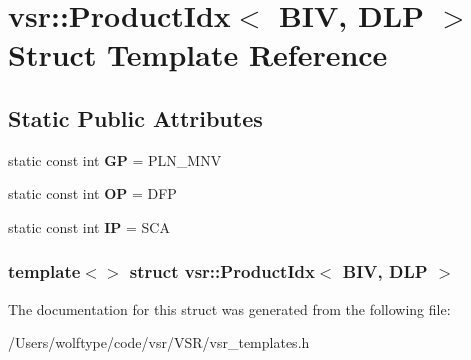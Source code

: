 \hypertarget{structvsr_1_1_product_idx_3_01_b_i_v_00_01_d_l_p_01_4}{\section{vsr\-:\-:Product\-Idx$<$ B\-I\-V, D\-L\-P $>$ Struct Template Reference}
\label{structvsr_1_1_product_idx_3_01_b_i_v_00_01_d_l_p_01_4}
}
\subsection*{Static Public Attributes}
\begin{DoxyCompactItemize}
\item 
\hypertarget{structvsr_1_1_product_idx_3_01_b_i_v_00_01_d_l_p_01_4_af28d45c310c383c840bd49067673ac1e}{static const int {\bfseries G\-P} = P\-L\-N\-\_\-\-M\-N\-V}\label{structvsr_1_1_product_idx_3_01_b_i_v_00_01_d_l_p_01_4_af28d45c310c383c840bd49067673ac1e}

\item 
\hypertarget{structvsr_1_1_product_idx_3_01_b_i_v_00_01_d_l_p_01_4_a1741eb25eaa2f29f236994af492e22d4}{static const int {\bfseries O\-P} = D\-F\-P}\label{structvsr_1_1_product_idx_3_01_b_i_v_00_01_d_l_p_01_4_a1741eb25eaa2f29f236994af492e22d4}

\item 
\hypertarget{structvsr_1_1_product_idx_3_01_b_i_v_00_01_d_l_p_01_4_aace2c618bcf8def58f5c172bdaf89d93}{static const int {\bfseries I\-P} = S\-C\-A}\label{structvsr_1_1_product_idx_3_01_b_i_v_00_01_d_l_p_01_4_aace2c618bcf8def58f5c172bdaf89d93}

\end{DoxyCompactItemize}
\subsubsection*{template$<$$>$ struct vsr\-::\-Product\-Idx$<$ B\-I\-V, D\-L\-P $>$}



The documentation for this struct was generated from the following file\-:\begin{DoxyCompactItemize}
\item 
/\-Users/wolftype/code/vsr/\-V\-S\-R/vsr\-\_\-templates.\-h\end{DoxyCompactItemize}
